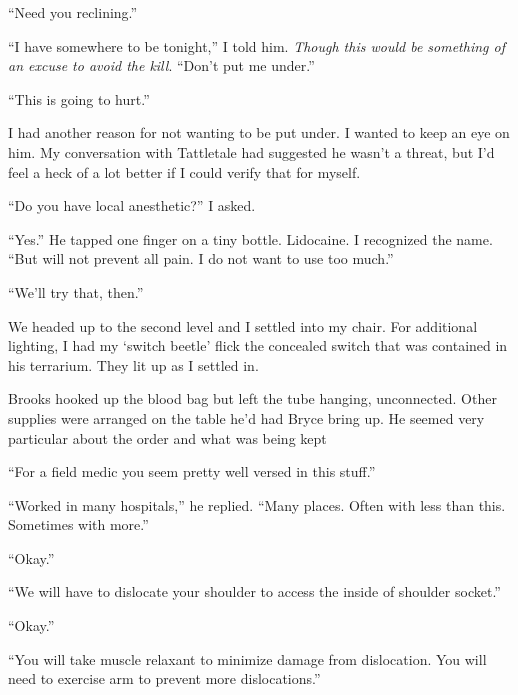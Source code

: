``Need you reclining.''



``I have somewhere to be tonight,'' I told him.  \emph{Though this would be something of an excuse to avoid the kill}.  ``Don't put me under.''



``This is going to hurt.''



I had another reason for not wanting to be put under.  I wanted to keep an eye on him.  My conversation with Tattletale had suggested he wasn't a threat, but I'd feel a heck of a lot better if I could verify that for myself.



``Do you have local anesthetic?'' I asked.



``Yes.''  He tapped one finger on a tiny bottle.  Lidocaine.  I recognized the name.  ``But will not prevent all pain.  I do not want to use too much.''



``We'll try that, then.''



We headed up to the second level and I settled into my chair.  For additional lighting, I had my `switch beetle' flick the concealed switch that was contained in his terrarium.  They lit up as I settled in.



Brooks hooked up the blood bag but left the tube hanging, unconnected.  Other supplies were arranged on the table he'd had Bryce bring up.  He seemed very particular about the order and what was being kept



``For a field medic you seem pretty well versed in this stuff.''



``Worked in many hospitals,'' he replied.  ``Many places.  Often with less than this.  Sometimes with more.''



``Okay.''



``We will have to dislocate your shoulder to access the inside of shoulder socket.''



``Okay.''



``You will take muscle relaxant to minimize damage from dislocation.  You will need to exercise arm to prevent more dislocations.''



